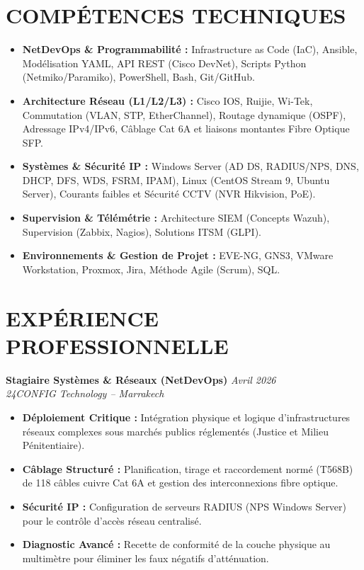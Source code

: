 \documentclass[10pt,a4paper]{article}
\begin{document}
\section*{COMPÉTENCES TECHNIQUES}
\begin{itemize}[leftmargin=*, itemsep=0.8pt, parsep=0pt, topsep=1.0pt]
    \item \textbf{NetDevOps \& Programmabilité :} Infrastructure as Code (IaC), Ansible, Modélisation YAML, API REST (Cisco DevNet), Scripts Python (Netmiko/Paramiko), PowerShell, Bash, Git/GitHub.
    \item \textbf{Architecture Réseau (L1/L2/L3) :} Cisco IOS, Ruijie, Wi-Tek, Commutation (VLAN, STP, EtherChannel), Routage dynamique (OSPF), Adressage IPv4/IPv6, Câblage Cat 6A et liaisons montantes Fibre Optique SFP.
    \item \textbf{Systèmes \& Sécurité IP :} Windows Server (AD DS, RADIUS/NPS, DNS, DHCP, DFS, WDS, FSRM, IPAM), Linux (CentOS Stream 9, Ubuntu Server), Courants faibles et Sécurité CCTV (NVR Hikvision, PoE).
    \item \textbf{Supervision \& Télémétrie :} Architecture SIEM (Concepts Wazuh), Supervision (Zabbix, Nagios), Solutions ITSM (GLPI).
    \item \textbf{Environnements \& Gestion de Projet :} EVE-NG, GNS3, VMware Workstation, Proxmox, Jira, Méthode Agile (Scrum), SQL.
\end{itemize}

\section*{EXPÉRIENCE PROFESSIONNELLE}
\noindent
\textbf{Stagiaire Systèmes \& Réseaux (NetDevOps)} \hfill \textit{Avril 2026}\\
\textit{24CONFIG Technology -- Marrakech}
\begin{itemize}[leftmargin=*, itemsep=0.8pt, parsep=0pt, topsep=1.0pt]
    \item \textbf{Déploiement Critique :} Intégration physique et logique d'infrastructures réseaux complexes sous marchés publics réglementés (Justice et Milieu Pénitentiaire).
    \item \textbf{Câblage Structuré :} Planification, tirage et raccordement normé (T568B) de 118 câbles cuivre Cat 6A et gestion des interconnexions fibre optique.
    \item \textbf{Sécurité IP :} Configuration de serveurs RADIUS (NPS Windows Server) pour le contrôle d'accès réseau centralisé.
    \item \textbf{Diagnostic Avancé :} Recette de conformité de la couche physique au multimètre pour éliminer les faux négatifs d'atténuation.
\end{itemize}
\end{document}

